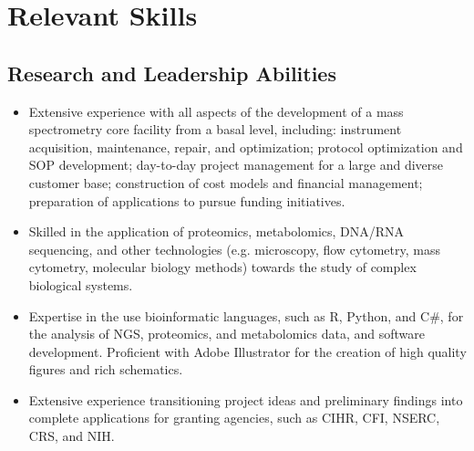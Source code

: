 \documentclass[11pt]{article}
\begin{document}
\section*{Relevant Skills}
\begin{addmargin}[3em]{2em}%
	\subsection*{Research and Leadership Abilities}
	\begin{itemize}
		\item Extensive experience with all aspects of the development of a mass spectrometry core facility from a basal level, including: instrument acquisition, maintenance, repair, and optimization; protocol optimization and SOP development; day-to-day project management for a large and diverse customer base; construction of cost models and financial management; preparation of applications to pursue funding initiatives. 
        \item Skilled in the application of proteomics, metabolomics, DNA/RNA sequencing, and other technologies (e.g. microscopy, flow cytometry, mass cytometry, molecular biology methods) towards the study of complex biological systems.
        \item Expertise in the use bioinformatic languages, such as R, Python, and C\#, for the analysis of NGS, proteomics, and metabolomics data, and software development. Proficient with Adobe Illustrator for the creation of high quality figures and rich schematics.
        \item Extensive experience transitioning project ideas and preliminary findings into complete applications for granting agencies, such as CIHR, CFI, NSERC, CRS, and NIH.		
	\end{itemize}
\end{addmargin}
\end{document}
